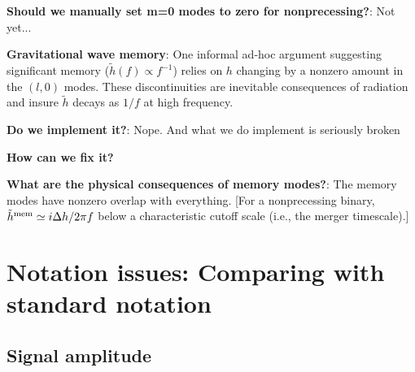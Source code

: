 \documentclass[twocolumn,prd,nofootinbib]{revtex4}
\begin{document}
\textbf{Should we manually set m=0 modes to zero for nonprecessing?}: Not yet...

\begin{shaded}
\noindent \textbf{Gravitational wave memory}: One informal   ad-hoc argument suggesting significant memory ($\tilde{h}(f)\propto f^{-1}$)
  relies on $h$ changing by a nonzero amount in the $(l,0)$ modes.    These discontinuities are inevitable consequences
  of radiation and insure $\tilde{h}$ decays as $1/f$ at high frequency.

\noindent \textbf{Do we implement it?}: Nope.  And what we do implement is seriously broken

\noindent \textbf{How can we fix it?}

\noindent \textbf{What are the physical consequences of memory modes?}: The memory modes have nonzero overlap with
everything. [For a nonprecessing binary, $\tilde{h}^{\rm mem} \simeq i \Delta h/2\pi f$ below a characteristic cutoff
scale (i.e., the merger timescale).]
\end{shaded}
\section{Notation issues: Comparing with standard notation}

\subsection{Signal amplitude}
\end{document}
